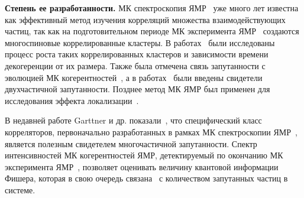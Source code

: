 



\textbf{Степень ее разработанности.}
МК спектроскопия ЯМР~\cite{Baum1985} уже много лет известна как эффективный метод изучения корреляций множества взаимодействующих частиц,
так как на подготовительном периоде МК эксперимента ЯМР~\cite{Baum1985} создаются многоспиновые коррелированные кластеры.
В работах~\cite{Krojanski2004, Cho2006, Bochkin2018} были исследованы процесс роста таких коррелированных кластеров и зависимости времени декогеренции от их размера.
Также была отмечена связь запутанности с эволюцией МК когерентностей~\cite{Doronin2003, Furman2008, Furman2009},
а в работах~\cite{Feldman2008, Feldman2012} были введены свидетели двухчастичной запутанности.
Позднее метод МК ЯМР был применен для исследования эффекта локализации~\cite{Alvarez2010, Alvarez2013, Alvarez2015, Wei2018}.

В недавней работе Garttner и др. показали~\cite{Garttner2018},
что специфический класс корреляторов,
первоначально разработанных в рамках МК спектроскопии ЯМР~\cite{Baum1985},
является полезным свидетелем многочастичной запутанности.
Спектр интенсивностей МК когерентностей ЯМР,
детектируемый по окончанию МК эксперимента ЯМР~\cite{Baum1985},
позволяет оценивать величину квантовой информации Фишера,
которая в свою очередь связана~\cite{Toth2014} с количеством запутанных частиц в системе.

